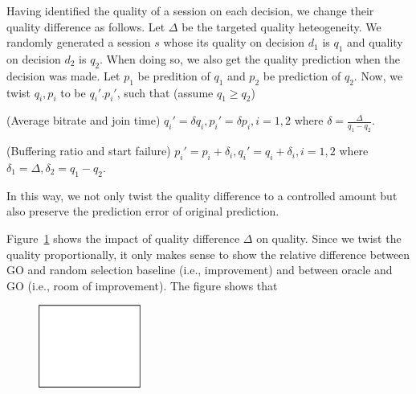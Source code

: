 Having identified the quality of a session on each decision, we change their quality difference as follows. Let $\Delta$ be the targeted quality heteogeneity. We randomly generated a session $s$ whose its quality on decision $d_1$ is $q_1$ and quality on decision $d_2$ is $q_2$. 
When doing so, we also get the quality prediction when the decision was made. Let $p_1$ be predition of $q_1$ and $p_2$ be prediction of $q_2$. Now, we twist $q_i,p_i$ to be $q_i'.p_i'$, such that (assume $q_1\geq q_2$)
\begin{packeditemize}
	\item (Average bitrate and join time) $q_i'=\delta q_i,p_i'=\delta p_i, i=1,2$ where $\delta=\frac{\Delta}{q_1-q_2}$.
	\item (Buffering ratio and start failure) $p_i'=p_i+\delta_i,q_i'=q_i+\delta_i, i=1,2$ where $\delta_1=\Delta, \delta_2=q_1-q_2$.
\end{packeditemize}
In this way, we not only twist the quality difference to a controlled amount but also preserve the prediction error of original prediction.

Figure~\ref{fig:impact-difference} shows the impact of quality difference $\Delta$ on quality. Since we twist the quality proportionally, it only makes sense to show the relative difference between GO and random selection baseline (i.e., improvement) and between oracle and GO (i.e., room of improvement). The figure shows that \fillme

\begin{figure}[h!]
\centering
 \includegraphics[width=0.3\textwidth] {figures/placeholder.pdf}
\label{fig:impact-difference}
\end{figure}



